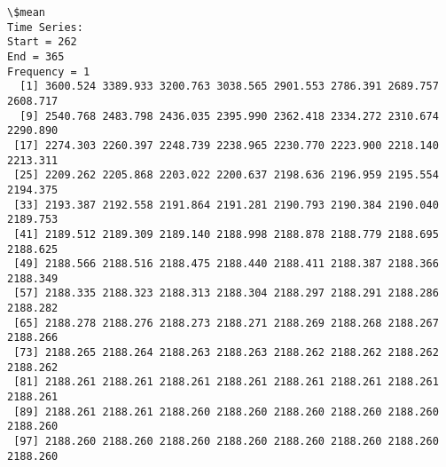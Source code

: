 \documentclass[11pt]{article}
\begin{document}
    \begin{Verbatim}[commandchars=\\\{\}]
\$mean
Time Series:
Start = 262 
End = 365 
Frequency = 1 
  [1] 3600.524 3389.933 3200.763 3038.565 2901.553 2786.391 2689.757 2608.717
  [9] 2540.768 2483.798 2436.035 2395.990 2362.418 2334.272 2310.674 2290.890
 [17] 2274.303 2260.397 2248.739 2238.965 2230.770 2223.900 2218.140 2213.311
 [25] 2209.262 2205.868 2203.022 2200.637 2198.636 2196.959 2195.554 2194.375
 [33] 2193.387 2192.558 2191.864 2191.281 2190.793 2190.384 2190.040 2189.753
 [41] 2189.512 2189.309 2189.140 2188.998 2188.878 2188.779 2188.695 2188.625
 [49] 2188.566 2188.516 2188.475 2188.440 2188.411 2188.387 2188.366 2188.349
 [57] 2188.335 2188.323 2188.313 2188.304 2188.297 2188.291 2188.286 2188.282
 [65] 2188.278 2188.276 2188.273 2188.271 2188.269 2188.268 2188.267 2188.266
 [73] 2188.265 2188.264 2188.263 2188.263 2188.262 2188.262 2188.262 2188.262
 [81] 2188.261 2188.261 2188.261 2188.261 2188.261 2188.261 2188.261 2188.261
 [89] 2188.261 2188.261 2188.260 2188.260 2188.260 2188.260 2188.260 2188.260
 [97] 2188.260 2188.260 2188.260 2188.260 2188.260 2188.260 2188.260 2188.260


\end{Verbatim}
\end{document}
